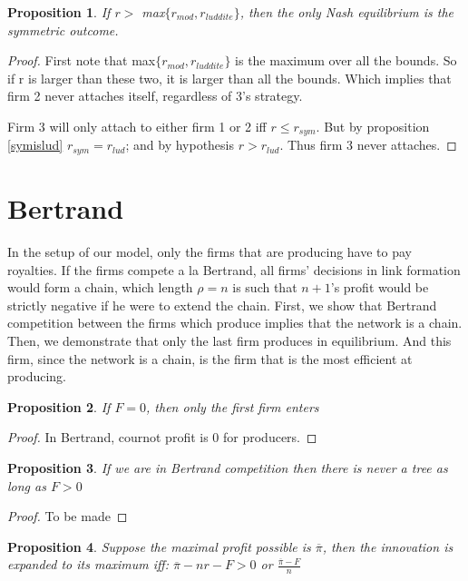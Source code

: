 \documentclass{article}
\newtheorem{proposition}{Proposition}
\begin{document}
\begin{proposition} \label{Symmetric}
If $r>$ max$\{ r_{mod},r_{luddite} \}$, then the only Nash equilibrium is the symmetric outcome. 
\end{proposition}

\begin{proof}
First note that max$\{ r_{mod},r_{luddite} \}$ is the maximum over all the bounds. So if r is larger than these two, it is larger than all the bounds. Which implies that firm 2 never attaches itself, regardless of 3's strategy. 

Firm 3 will only attach to either firm 1 or 2 iff $r \leq r_{sym}$. But by proposition \ref{symislud} $r_{sym}=r_{lud}$; and by hypothesis $r > r_{lud}$. Thus firm 3 never attaches. 
\end{proof}


\section{Bertrand}

In the setup of our model, only the firms that are producing have to pay royalties. If the firms compete a la Bertrand, all firms' decisions in link formation would form a chain, which length $\rho=n$ is such that $n+1$'s profit would be strictly negative if he were to extend the chain. First, we show that Bertrand competition between the firms which produce implies that the network is a chain. Then, we demonstrate that only the last firm produces in equilibrium. And this firm, since the network is a chain, is the firm that is the most efficient at producing.  

\begin{proposition}
If $F=0$, then only the first firm enters
\end{proposition}

\begin{proof}
In Bertrand, cournot profit is 0 for producers. 
\end{proof}

\begin{proposition}
If we are in Bertrand competition then there is never a tree as long as $F>0$
\end{proposition}

\begin{proof}
To be made
\end{proof}



\begin{proposition}
Suppose the maximal profit possible is $\overline{\pi}$, then the innovation is expanded to its maximum iff: $\overline{\pi}-n r-F>0$ or $\frac{\overline{\pi}-F}{n}$
\end{proposition}
\end{document}
